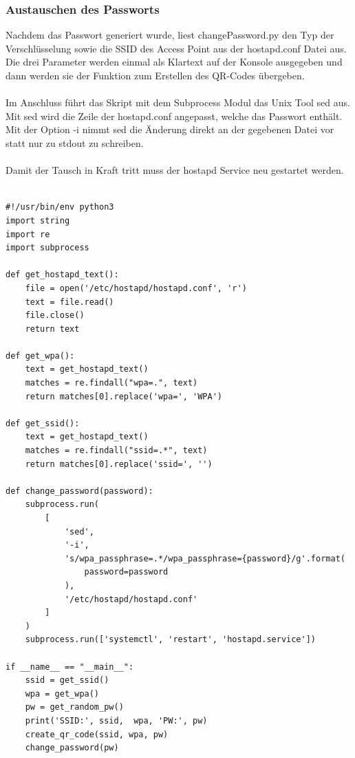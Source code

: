 \documentclass[a4paper,11pt,singlespacing]{article}
\begin{document}
    	\subsubsection{Austauschen des Passworts}
    		Nachdem das Passwort generiert wurde, liest changePassword.py den Typ der Verschlüsselung sowie die SSID des Access Point aus der hostapd.conf Datei aus. Die drei Parameter werden einmal als Klartext auf der Konsole ausgegeben und dann werden sie der Funktion zum Erstellen des QR-Codes übergeben. \\ \\
    		Im Anschluss führt das Skript mit dem Subprocess Modul das Unix Tool sed aus. Mit sed wird die Zeile der hostapd.conf angepasst, welche das Passwort enthält. Mit der Option -i nimmt sed die Änderung direkt an der gegebenen Datei vor statt nur zu stdout zu schreiben. \\ \\
    		Damit der Tausch in Kraft tritt muss der hostapd Service neu gestartet werden. \\ \\
   

\begin{lstlisting}
#!/usr/bin/env python3
import string
import re
import subprocess	

def get_hostapd_text():
    file = open('/etc/hostapd/hostapd.conf', 'r')
    text = file.read()
    file.close()
    return text

def get_wpa():
    text = get_hostapd_text()
    matches = re.findall("wpa=.", text)
    return matches[0].replace('wpa=', 'WPA')

def get_ssid():
    text = get_hostapd_text()
    matches = re.findall("ssid=.*", text)
    return matches[0].replace('ssid=', '')
    
def change_password(password):
    subprocess.run(
        [
            'sed',
            '-i',
            's/wpa_passphrase=.*/wpa_passphrase={password}/g'.format(
                password=password
            ),
            '/etc/hostapd/hostapd.conf'
        ]
    )
    subprocess.run(['systemctl', 'restart', 'hostapd.service'])
    
if __name__ == "__main__":
    ssid = get_ssid()
    wpa = get_wpa()
    pw = get_random_pw()
    print('SSID:', ssid,  wpa, 'PW:', pw)
    create_qr_code(ssid, wpa, pw)
    change_password(pw)

\end{lstlisting}
    	
\end{document}
